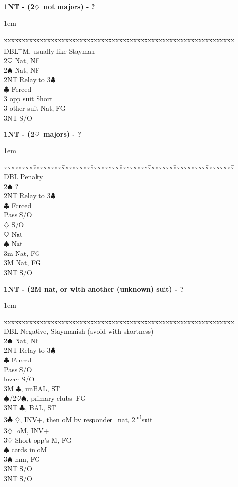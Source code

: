 \documentclass[10pt]{article}
\renewcommand{\c}{$\clubsuit$}
\renewcommand{\d}{$\diamondsuit$}
\newcommand{\h}{$\heartsuit$}
\newcommand{\s}{$\spadesuit$}
\newcommand{\p}{\textsuperscript{+}}
\newcommand{\x}{DBL}
\newcommand{\ndh}{2\textsuperscript{nd}}
\newenvironment{bidtable}[1][]
{\textbf{#1}
  \begin{adjustwidth}{1em}{}
    \addvspace{2pt}
    \begin{tabbing}
      xxxxxxxx\=xxxxxxxx\=xxxxxxxx\=xxxxxxxx\=xxxxxxxx\=xxxxxxx\=xxxxxxxxx\=xxxxxxxx\=\kill}
{\end{tabbing}\end{adjustwidth}\bigskip}%
\begin{document}
\begin{bidtable}[1NT - (2\d\ not majors) - ?]
\x           {}\p M, usually like Stayman \\
2\h          \> Nat, NF                     \\
2\s          \> Nat, NF                     \\
2NT          \> Relay to 3\c                \\
             \c \> Forced               \\
3 opp suit   \> Short                       \\
3 other suit \> Nat, FG                     \\
3NT          \> S/O
\end{bidtable}

\begin{bidtable}[1NT - (2\h\ majors) - ?]
\x  \> Penalty            \\
2\s \> ?                  \\
2NT \> Relay to 3\c       \\
    \c \> Forced      \\
    \>     \> Pass \> S/O \\
    \>     \d  \> S/O \\
    \>     \h  \> Nat \\
    \>     \s  \> Nat \\
3m  \> Nat, FG            \\
3M  \> Nat, FG            \\
3NT \> S/O
\end{bidtable}

\begin{bidtable}[1NT - (2M nat, or with another (unknown) suit) - ?]
\x  \> Negative, Staymanish (avoid with shortness)   \\
2\s \> Nat, NF                                       \\
2NT \> Relay to 3\c                                  \\
    \c \> Forced                                 \\
    \>     \> Pass    \> S/O                         \\
    \>      lower \> S/O                         \\
    \>     \> 3M      \> \c, unBAL, ST               \\
    \>     \s/2\h {}\s, primary clubs, FG      \\
    \>     \> 3NT     \> \c, BAL, ST                 \\
3\c \> \d, INV+, then oM by responder=nat, \ndh suit \\
3\d {}\p oM, INV+                                  \\
3\h \> Short opp's M, FG                             \\
    \s {} cards in oM                          \\
3\s \> mm, FG                                        \\
    \> 3NT \> S/O                                    \\
3NT \> S/O
\end{bidtable}
\end{document}
